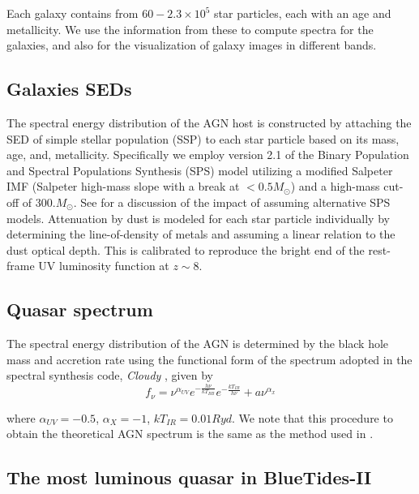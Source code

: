 \documentclass[twocolumn,useAMS,usenatbib]{mnras} \usepackage{natbib}
\begin{document}
Each galaxy contains from $60 - 2.3\times10^{5}$ star particles, each with an age and metallicity.
We use the information from these to compute spectra for the galaxies, and
also for the visualization of galaxy images in different bands. 

\subsection{Galaxies SEDs}\label{galseds}
The spectral energy distribution of the AGN host is constructed by attaching the SED of simple stellar population (SSP) to each star particle based on its mass, age, and, metallicity. 
Specifically we employ version 2.1 of the Binary Population and Spectral Populations Synthesis (SPS) \citep[BPASS][]{2017PASA...34...58E} model utilizing a modified Salpeter IMF (Salpeter high-mass slope with a break at $<0.5 M_{\odot}$) and a high-mass cut-off of $300. M_{\odot}$. See \citep{2016MNRAS.460.3170W} for a discussion of the impact of assuming alternative SPS models. Attenuation by dust is modeled for each star particle individually by determining the line-of-density of metals and assuming a linear relation to the dust optical depth. This is calibrated to reproduce the bright end of the rest-frame UV luminosity function at $z\sim8 $\citep[see][]{2017MNRAS.469.2517W}.

\subsection{Quasar spectrum}\label{agnseds}
The spectral energy distribution of the AGN is determined by the black hole mass and accretion rate using the functional form of the spectrum adopted in the spectral synthesis code, {\em Cloudy } \citep{2013RMxAA..49..137F}, given by 
\begin{equation} \label{eq1}
f_{\nu} = \nu ^{\alpha _{UV}}e ^{-\frac{h \nu}{k T_{BB}}} e ^{- \frac{k T_{IR}}{h \nu}} + a \nu ^{\alpha _{x}}
\end{equation}

where $\alpha _{UV} = -0.5$, $\alpha _{X} = -1$, $k T_{IR} = 0.01Ryd$. We note that this procedure to obtain the theoretical AGN spectrum is the same as the method used in \cite{2017ApJ...849..155V}.



\subsection{The most luminous quasar in BlueTides-II}
\end{document}
